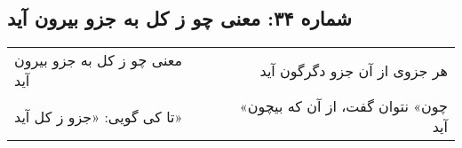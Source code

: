 \begin{center}
\section*{شماره ۳۴: معنی چو ز کل به جزو بیرون آید}
\label{sec:034}
\begin{longtable}{l p{0.5cm} r}
معنی چو ز کل به جزو بیرون آید
&&
هر جزوی از آن جزو دگرگون آید
\\
تا کی گویی: «جزو ز کل آید»
&&
«چون» نتوان گفت، از آن که بیچون آید
\\
\end{longtable}
\end{center}

